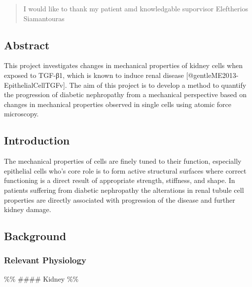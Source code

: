 \documentclass[
  paper=a4,
  ,captions=tableheading
]{scrartcl}
\begin{document}
\begin{abstract}
\begin{justify}
I would like to thank my patient amd knowledgable suporvisor Eleftherios
Siamantouras
\end{justify}
\end{abstract}
\pagebreak


\setcounter{page}{0} %



\renewcommand*\contentsname{}
\renewcommand*\contentsname{Table of Contents}
{
\setcounter{tocdepth}{3}
\tableofcontents
\newpage
}
\subsection{Abstract}\label{abstract}

This project investigates changes in mechanical properties of kidney
cells when exposed to TGF-β1, which is known to induce renal disease
{[}@gentleME2013-EpithelialCellTGFv{]}. The aim of this project is to
develop a method to quantify the progression of diabetic nephropathy
from a mechanical perspective based on changes in mechanical properties
observed in single cells using atomic force microscopy.

\subsection{Introduction}\label{introduction}

The mechanical properties of cells are finely tuned to their function,
especially epithelial cells who's core role is to form active structural
surfaces where correct functioning is a direct result of appropriate
strength, stiffness, and shape. In patients suffering from diabetic
nephropathy the alterations in renal tubule cell properties are directly
associated with progression of the disease and further kidney damage.

\subsection{Background}\label{background}

\subsubsection{Relevant Physiology}\label{relevant-physiology}

\%\% \#\#\#\# Kidney \%\%
\end{document}
